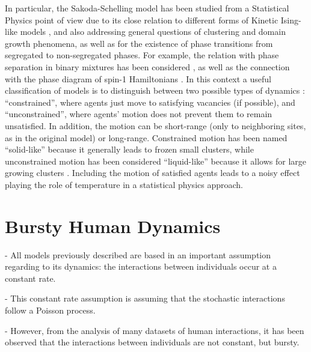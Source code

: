 In particular, the Sakoda-Schelling model has been studied from a Statistical Physics point of view due to its close relation to different forms of Kinetic Ising-like models \cite{stauffer-2007,stauffer-2013}, and also addressing general questions of clustering and domain growth phenomena, as well as for the existence of phase transitions from segregated to non-segregated phases. For example, the relation with phase separation in binary mixtures has been considered \cite{Dall_Asta_2008,Vinkovic}, as well as the connection with the phase diagram of spin-1 Hamiltonians \cite{BEG,BlumeCapel,Gauvin_2009,Gauvin_2010}.
In this context a useful classification of models is to distinguish between two possible types of dynamics \cite{Dall_Asta_2008}: ``constrained'', where agents just move to satisfying vacancies (if possible), and ``unconstrained'',  where agents' motion does not prevent them to remain unsatisfied. In addition, the motion can be short-range (only to neighboring sites, as in the original model) or long-range. Constrained motion has been named ``solid-like'' because it generally leads to frozen small clusters, while unconstrained motion has been considered ``liquid-like'' because it allows for large growing clusters \cite{Vinkovic}. Including the motion of satisfied agents leads to a noisy effect playing the role of temperature in a statistical physics approach. 

\section{\label{sec: Bursty Human Dynamics} Bursty Human Dynamics}

- All models previously described are based in an important assumption regarding to its dynamics: the interactions between individuals occur at a constant rate.

- This constant rate assumption is assuming that the stochastic interactions follow a Poisson process. 

- However, from the analysis of many datasets of human interactions, it has been observed that the interactions between individuals are not constant, but bursty.

